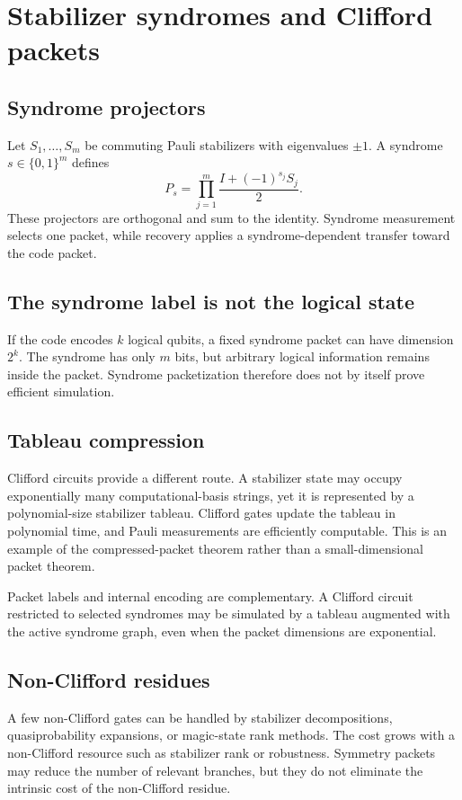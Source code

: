 \chapter{Stabilizer syndromes and Clifford packets}
\label{ch:stabilizer}

\section{Syndrome projectors}
Let $S_1,\ldots,S_m$ be commuting Pauli stabilizers with eigenvalues $\pm1$. A syndrome $s\in\{0,1\}^m$ defines
\[
P_s
=
\prod_{j=1}^m
\frac{I+(-1)^{s_j}S_j}{2}.
\]
These projectors are orthogonal and sum to the identity. Syndrome measurement selects one packet, while recovery applies a syndrome-dependent transfer toward the code packet.

\section{The syndrome label is not the logical state}
If the code encodes $k$ logical qubits, a fixed syndrome packet can have dimension $2^k$. The syndrome has only $m$ bits, but arbitrary logical information remains inside the packet. Syndrome packetization therefore does not by itself prove efficient simulation.

\section{Tableau compression}
Clifford circuits provide a different route. A stabilizer state may occupy exponentially many computational-basis strings, yet it is represented by a polynomial-size stabilizer tableau. Clifford gates update the tableau in polynomial time, and Pauli measurements are efficiently computable. This is an example of the compressed-packet theorem rather than a small-dimensional packet theorem.

\begin{derivedbox}
Packet labels and internal encoding are complementary. A Clifford circuit restricted to selected syndromes may be simulated by a tableau augmented with the active syndrome graph, even when the packet dimensions are exponential.
\end{derivedbox}

\section{Non-Clifford residues}
A few non-Clifford gates can be handled by stabilizer decompositions, quasiprobability expansions, or magic-state rank methods. The cost grows with a non-Clifford resource such as stabilizer rank or robustness. Symmetry packets may reduce the number of relevant branches, but they do not eliminate the intrinsic cost of the non-Clifford residue.

